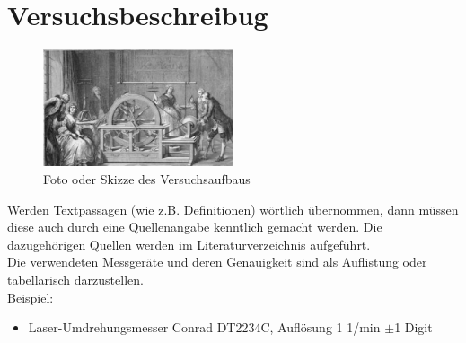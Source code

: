 \section{Versuchsbeschreibug}
\label{section:Versuchsbeschreibung}
%
\begin{figure}[!h]
		\centering
		\includegraphics[width=0.5\textwidth]{Abbildungen/Beispielbild_Versuchsaufbau.eps}
		\caption{Foto oder Skizze des Versuchsaufbaus}
		\label{fig:BspVers}
\end{figure}
%
Werden Textpassagen (wie z.B. Definitionen) wörtlich übernommen, dann müssen diese auch durch eine Quellenangabe kenntlich gemacht werden. Die dazugehörigen Quellen werden im Literaturverzeichnis aufgeführt.\\

Die verwendeten Messgeräte und deren Genauigkeit sind als Auflistung oder tabellarisch darzustellen.\\

Beispiel:
%
\begin{itemize}
\item Laser-Umdrehungsmesser Conrad DT2234C, Auflösung 1 1/min $\pm$1 Digit
\end{itemize}
%
